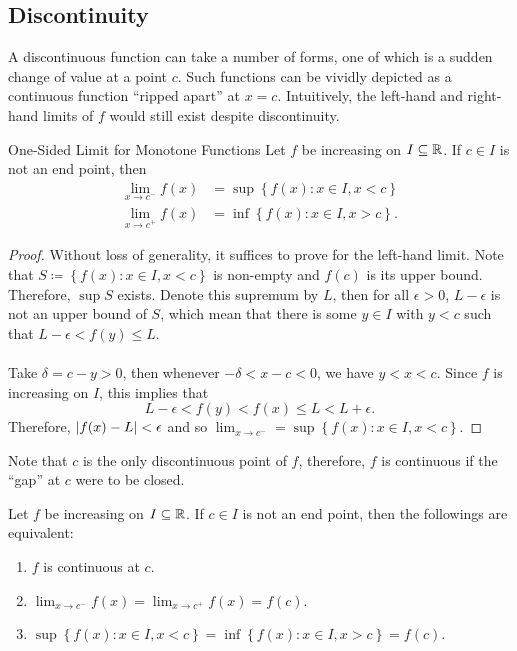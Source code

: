 \documentclass[math]{amznotes}
\theoremstyle{remark}
\begin{document}
\subsection{Discontinuity}
A discontinuous function can take a number of forms, one of which is a sudden change of value at a point $c$. Such functions can be vividly depicted as a continuous function ``ripped apart'' at $x = c$. Intuitively, the left-hand and right-hand limits of $f$ would still exist despite discontinuity.
\begin{thmbox}{One-Sided Limit for Monotone Functions}
    Let $f$ be increasing on $I \subseteq \mathbb{R}$. If $c \in I$ is not an end point, then
    \begin{align*}
        \lim_{x \to c^-}f(x) & = \sup \left\{f(x) \colon x \in I, x < c\right\} \\
        \lim_{x \to c^+}f(x) & = \inf \left\{f(x) \colon x \in I, x > c\right\}.
    \end{align*}
    \tcblower
    \begin{proof}
        Without loss of generality, it suffices to prove for the left-hand limit. Note that $S \coloneqq \left\{f(x) \colon x \in I, x < c\right\}$ is non-empty and $f(c)$ is its upper bound. Therefore, $\sup S$ exists. Denote this supremum by $L$, then for all $\epsilon > 0$, $L - \epsilon$ is not an upper bound of $S$, which mean that there is some $y \in I$ with $y < c$ such that $L - \epsilon < f(y) \leq L$.
        \\\\
        Take $\delta = c - y > 0$, then whenever $-\delta < x - c < 0$, we have $y < x < c$. Since $f$ is increasing on $I$, this implies that \begin{equation*}
            L - \epsilon < f(y) < f(x) \leq L < L + \epsilon.
        \end{equation*}
        Therefore, ${\left\lvert {f(x) - L} \right\rvert} <  \epsilon$ and so $\lim_{x \to c^-} = \sup \left\{f(x) \colon x \in I, x < c\right\}$.
    \end{proof}
\end{thmbox}
Note that $c$ is the only discontinuous point of $f$, therefore, $f$ is continuous if the ``gap'' at $c$ were to be closed.
\begin{corbox}{}{}
    Let $f$ be increasing on $I \subseteq \mathbb{R}$. If $c \in I$ is not an end point, then the followings are equivalent:
    \begin{enumerate}
        \item $f$ is continuous at $c$.
        \item $\lim_{x \to c^-}f(x) = \lim_{x \to c^+}f(x) = f(c)$.
        \item $\sup \left\{f(x) \colon x \in I, x < c\right\} = \inf \left\{f(x) \colon x \in I, x > c\right\} = f(c)$.
    \end{enumerate}
\end{corbox}
\end{document}
